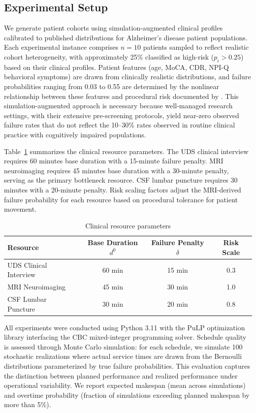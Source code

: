 \documentclass[msom,blindrev]{informs3}
\begin{document}
\subsection{Experimental Setup}
\label{sec:experimental_setup}

We generate patient cohorts using simulation-augmented clinical profiles calibrated to published distributions for Alzheimer's disease patient populations. Each experimental instance comprises $n = 10$ patients sampled to reflect realistic cohort heterogeneity, with approximately 25\% classified as high-risk ($p_i > 0.25$) based on their clinical profiles. Patient features (age, MoCA, CDR, NPI-Q behavioral symptoms) are drawn from clinically realistic distributions, and failure probabilities ranging from 0.03 to 0.55 are determined by the nonlinear relationship between these features and procedural risk documented by \citet{porembka2025disparities}. This simulation-augmented approach is necessary because well-managed research settings, with their extensive pre-screening protocols, yield near-zero observed failure rates that do not reflect the 10--30\% rates observed in routine clinical practice with cognitively impaired populations.

Table~\ref{tab:resource_params} summarizes the clinical resource parameters. The UDS clinical interview requires 60 minutes base duration with a 15-minute failure penalty. MRI neuroimaging requires 45 minutes base duration with a 30-minute penalty, serving as the primary bottleneck resource. CSF lumbar puncture requires 30 minutes with a 20-minute penalty. Risk scaling factors adjust the MRI-derived failure probability for each resource based on procedural tolerance for patient movement.

\begin{table}[htbp]
\centering
\caption{Clinical resource parameters}
\label{tab:resource_params}
\begin{tabular}{@{}lccc@{}}
\toprule
\textbf{Resource} & \textbf{Base Duration} $d^0$ & \textbf{Failure Penalty} $\delta$ & \textbf{Risk Scale} \\
\midrule
UDS Clinical Interview & 60 min & 15 min & 0.3 \\
MRI Neuroimaging & 45 min & 30 min & 1.0 \\
CSF Lumbar Puncture & 30 min & 20 min & 0.8 \\
\bottomrule
\end{tabular}
\end{table}

All experiments were conducted using Python 3.11 with the PuLP optimization library interfacing the CBC mixed-integer programming solver. Schedule quality is assessed through Monte Carlo simulation: for each schedule, we simulate 100 stochastic realizations where actual service times are drawn from the Bernoulli distributions parameterized by true failure probabilities. This evaluation captures the distinction between planned performance and realized performance under operational variability. We report expected makespan (mean across simulations) and overtime probability (fraction of simulations exceeding planned makespan by more than 5\%).
\end{document}
